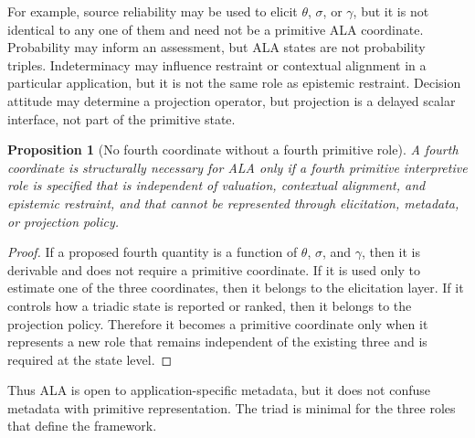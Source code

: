 \documentclass[reqno,final]{amsart}
\theoremstyle{definition}
\theoremstyle{plain}
\newtheorem{proposition}{Proposition}
\theoremstyle{remark}
\begin{document}
For example, source reliability may be used to elicit \(\theta\), \(\sigma\), or \(\gamma\), but it is not identical to any one of them and need not be a primitive ALA coordinate. Probability may inform an assessment, but ALA states are not probability triples. Indeterminacy may influence restraint or contextual alignment in a particular application, but it is not the same role as epistemic restraint. Decision attitude may determine a projection operator, but projection is a delayed scalar interface, not part of the primitive state.

\begin{proposition}[No fourth coordinate without a fourth primitive role]
\label{prop:no-fourth-coordinate}
A fourth coordinate is structurally necessary for ALA only if a fourth primitive interpretive role is specified that is independent of valuation, contextual alignment, and epistemic restraint, and that cannot be represented through elicitation, metadata, or projection policy.
\end{proposition}

\begin{proof}
If a proposed fourth quantity is a function of \(\theta\), \(\sigma\), and \(\gamma\), then it is derivable and does not require a primitive coordinate. If it is used only to estimate one of the three coordinates, then it belongs to the elicitation layer. If it controls how a triadic state is reported or ranked, then it belongs to the projection policy. Therefore it becomes a primitive coordinate only when it represents a new role that remains independent of the existing three and is required at the state level. 
\end{proof}

Thus ALA is open to application-specific metadata, but it does not confuse metadata with primitive representation. The triad is minimal for the three roles that define the framework.
\end{document}
